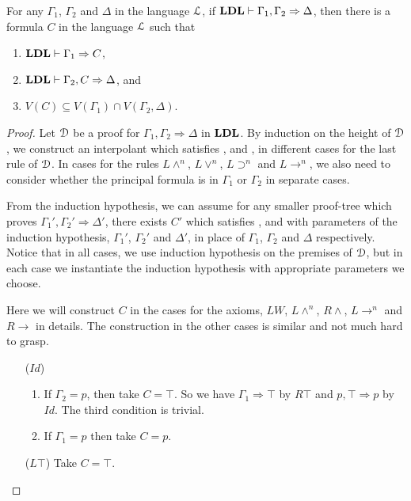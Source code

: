 \begin{thm}\label{thm:craig} For any $\Gamma_1$, $\Gamma_2$ and $\Delta$ in the language $\mathcal{L}$, if $\mathbf{LDL} \vdash \Gamma_1 , \Gamma_2 \Rightarrow \Delta$, then there is a formula $C$ in the language $\mathcal{L}$ such that
  \begin{enumerate}
    \item $\mathbf{LDL} \vdash \Gamma_1 \Rightarrow C$,
    \item $\mathbf{LDL} \vdash \Gamma_2 , C \Rightarrow \Delta$, and
    \item $V(C) \subseteq V(\Gamma_1) \cap V(\Gamma_2 , \Delta)$.
  \end{enumerate}
\end{thm}

\begin{proof}
Let $\mathcal{D}$ be a proof for $\Gamma_1 , \Gamma_2 \Rightarrow \Delta$ in $\mathbf{LDL}$. By induction on the height of $\mathcal{D}$, we construct an interpolant which satisfies \1, \2 and \3, in different cases for the last rule of $\mathcal{D}$. In cases for the rules $L \wedge ^n$, $L \vee ^n$, $L \supset ^n$ and $L \rightarrow ^n$, we also need to consider whether the principal formula is in $\Gamma_1$ or $\Gamma_2$ in separate cases.

From the induction hypothesis, we can assume for any smaller proof-tree which proves $\Gamma_1' , \Gamma_2' \Rightarrow \Delta'$, there exists $C'$ which satisfies \1, \2 and \3 with parameters of the induction hypothesis, $\Gamma_1'$, $\Gamma_2'$ and $\Delta'$, in place of $\Gamma_1$, $\Gamma_2$ and $\Delta$ respectively. Notice that in all cases, we use induction hypothesis on the premises of $\mathcal{D}$, but in each case we instantiate the induction hypothesis with appropriate parameters we choose.

Here we will construct $C$ in the cases for the axioms, $LW$, $L \wedge ^n$, $R \wedge$, $L \rightarrow ^n$ and $R \rightarrow$ in details. The construction in the other cases is similar and not much hard to grasp.


\begin{enumerate}
	\item[($Id$)]
	\begin{enumerate}
		\item If $\Gamma_2 = p$, then take $C = \top$. So we have $\Gamma_1 \Rightarrow \top$ by $R \top$ and $p , \top \Rightarrow p$ by $Id$. The third condition is trivial.
		
		\item If $\Gamma_1 = p$ then take $C = p$.
	\end{enumerate}
	\item[($L \top$)] Take $C = \top$.
	

\end{enumerate}
\end{proof}
